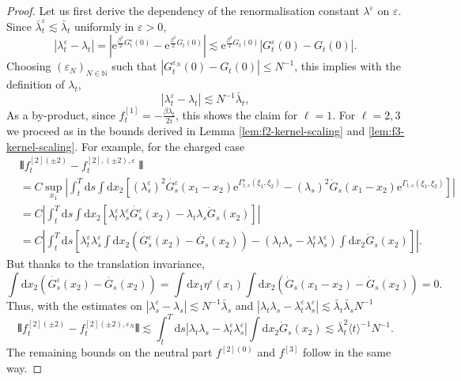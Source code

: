 \documentclass[11pt, a4paper]{scrartcl}
\numberwithin{equation}{section}
\theoremstyle{plain}
\theoremstyle{remark}
\newcommand{\mathd}{\mathrm{d}}
\newcommand{\mathe}{\mathrm{e}}
\begin{document}
\begin{proof}
	Let us first derive the dependency of the renormalisation constant
	$\lambda^{\varepsilon}$ on $\varepsilon$. Since $\bar{\lambda}^{\varepsilon}_t
		\lesssim \bar{\lambda}_t$ uniformly in $\varepsilon > 0$,
	\[ | \lambda_t^{\varepsilon} - \lambda_t | = \left|
		\mathe^{\frac{\beta^2}{2} G_t^{\varepsilon} (0)} -
		\mathe^{\frac{\beta^2}{2} G_t (0)} \right| \lesssim
		\mathe^{\frac{\beta^2}{2} G_t (0)} | G_t^{\varepsilon} (0) - G_t (0) | .
	\]
	Choosing $(\varepsilon_N)_{N \in \mathbb{N}}$ such that $|
		G^{\varepsilon_N}_t (0) - G_t (0) | \leqslant N^{- 1}$, this implies with
	the definition of $\lambda_t$,
	\[ | \lambda_t^{\varepsilon} - \lambda_t | \lesssim N^{- 1} \bar{\lambda}_t, \]
	As a by-product, since $f^{[1]}_t = - \frac{\beta \lambda_t}{2 i}$, this
	shows the claim for $\ell = 1$. For $\ell = 2, 3$ we proceed as in the
	bounds derived in Lemma \ref{lem:f2-kernel-scaling} and
	\ref{lem:f3-kernel-scaling}. For example, for the charged case
	\begin{equation*}
		\begin{aligned}
			 & \interleave f^{[2] (\pm 2)}_t - f_t^{[2], (\pm 2), \varepsilon}
			\interleave                                                          \\
			 & =  C \sup_{x_1}  \left| \int_t^T \mathd s \int \mathd
			x_2 [(\lambda_s^{\varepsilon})^2 \dot{G^{\varepsilon}_s} (x_1 - x_2)
			\mathe^{\Gamma_{t, s}^{\varepsilon} (\xi_1, \xi_2)} - (\lambda_s)^2
			\dot{G}_s (x_1 - x_2) \mathe^{\Gamma_{t, s} (\xi_1, \xi_2)}] \right| \\
			 & =  C \left| \int_t^T \mathd s \int \mathd x_2
			[\lambda_t^{\varepsilon} \lambda_s^{\varepsilon}
			\dot{G^{\varepsilon}_s} (x_2) - \lambda_t \lambda_s  \dot{G}_s (x_2)]
			\right|                                                              \\
			 & =  C \left| \int_t^T \mathd s \left[ \lambda_t^{\varepsilon}
				\lambda_s^{\varepsilon} \int \mathd x_2 \left( \dot{G^{\varepsilon}_s}
				(x_2) - \dot{G_s} \left( x_2 \right) \right) - (\lambda_t \lambda_s -
				\lambda_t^{\varepsilon} \lambda_s^{\varepsilon}) \int \mathd x_2
				\dot{G}_s (x_2) \right] \right| .
		\end{aligned}
	\end{equation*}
	But thanks to the translation invariance,
	\[ \int \mathd x_2 (\dot{G^{\varepsilon}_s} (x_2) - \dot{G_s} (x_2)) = \int
		\mathd x_1 \eta^{\varepsilon} (x_1)  \int \mathd x_2 (\dot{G}_s (x_1 -
		x_2) - \dot{G}_s (x_2)) = 0. \]
	Thus, with the estimates on $| \lambda_s^{\varepsilon} - \lambda_s |
		\lesssim N^{- 1} \bar{\lambda}_s$ and $| \lambda_t \lambda_s -
		\lambda_t^{\varepsilon} \lambda_s^{\varepsilon} | \lesssim \bar{\lambda}_t
		\bar{\lambda}_s N^{- 1}$
	\[ \interleave f^{[2] (\pm 2)}_t - f_t^{[2] (\pm 2), \varepsilon_N}
		\interleave \lesssim \int_t^T \mathd s | \lambda_t \lambda_s -
		\lambda_t^{\varepsilon} \lambda_s^{\varepsilon} |  \int \mathd x_2
		\dot{G}_s (x_2) \lesssim \bar{\lambda}_t^2 \langle t \rangle^{- 1} N^{- 1} . \]
	The remaining bounds on the neutral part $f^{[2] (0)}$ and $f^{[3]}$ follow
	in the same way.
\end{proof}
\end{document}
